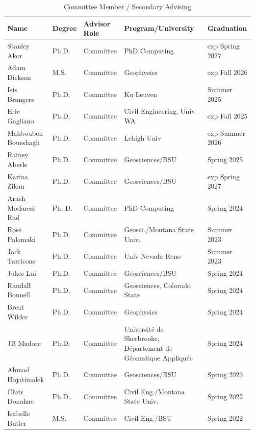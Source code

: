 \documentclass[11pt]{article}
\renewcommand\arraystretch{1}
\begin{document}
\begin{table}[!htbp]
\caption*{Committee Member / Secondary Advising}
\tiny
\renewcommand\arraystretch{0.7}
  \centering
  \begin{tabular}{|l|l|l|l|l|}
\hline
\textbf{Name} & \textbf{Degree} & \textbf{Advisor Role} & \textbf{Program/University} & \textbf{Graduation} \\ \hline \hline
Stanley Akor & Ph.D. & Committee & PhD Computing & exp Spring 2027 \\ \hline
Adam Dickson & M.S. & Committee & Geophysics & exp Fall 2026 \\ \hline
Isis Brangers & Ph.D. & Committee & Ku Leuven & Summer 2025 \\ \hline
Eric Gagliano & Ph.D. & Committee & Civil Engineering, Univ. WA & exp Fall 2025 \\ \hline
Mahboubeh Boueshagh & Ph.D. & Committee & Lehigh Univ & exp Summer 2026 \\ \hline
Rainey Aberle & Ph.D. & Committee & Geosciences/BSU & Spring 2025 \\ \hline
Karina Zikan & Ph.D. & Committee & Geosciences/BSU & exp Spring 2027 \\ \hline
Arash Modaresi Rad & Ph. D. & Committee & PhD Computing & Spring 2024 \\ \hline
Ross Palomaki & Ph.D. & Committee & Geosci./Montana State Univ. & Summer 2023 \\ \hline
Jack Tarricone & Ph.D. & Committee & Univ Nevada Reno & Summer 2023 \\ \hline
Jukes Lui & Ph.D. & Committee & Geosciences/BSU & Spring 2024 \\ \hline
Randall Bonnell & Ph.D. & Committee & Geosciences, Colorado State & Spring 2024 \\ \hline
Brent Wilder & Ph.D. & Committee & Geophysics & Spring 2024 \\ \hline
JB Madore & Ph.D. & Committee & Université de Sherbrooke, Département de Géomatique Appliquée & Spring 2024 \\ \hline
Ahmad Hojatimalek & Ph.D. & Committee & Geosciences/BSU & Spring 2023 \\ \hline
Chris Donahue & Ph.D. & Committee & Civil Eng./Montana State Univ. & Spring 2022 \\ \hline
Isabelle Butler & M.S. & Committee & Civil Eng./BSU & Spring 2022 \\ \hline

\end{tabular}
\end{table}
\end{document}
